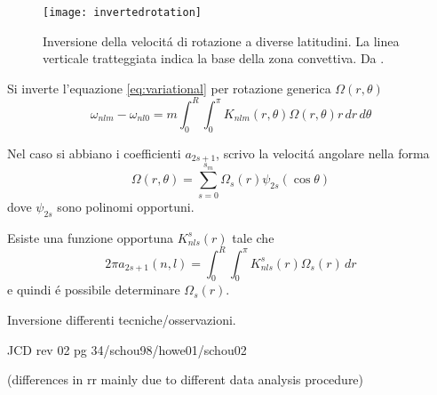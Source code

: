 \documentclass[../main.tex]{subfiles}
\begin{document}
\begin{figure}[!ht]
\centering
\texttt{[image: invertedrotation]}
\caption{Inversione della velocit\'a di rotazione a diverse latitudini. La linea verticale tratteggiata indica la base della zona convettiva. Da \cite{chr02helioseismology}.}
\end{figure}

Si inverte l'equazione \eqref{eq:variational} per rotazione generica $\Omega(r,\theta)$
\begin{equation}
\omega_{nlm}-\omega_{nl0}=m\int_0^R\int_0^{\pi}K_{nlm}(r,\theta)\Omega(r,\theta)r\,dr\,d\theta\label{eq:invrot2D}
\end{equation}

Nel caso si abbiano i coefficienti $a_{2s+1}$, scrivo la velocit\'a angolare nella forma
\begin{equation}
\Omega(r,\theta)=\sum_{s=0}^{s_m}\Omega_{s}(r)\psi_{2s}(\cos{\theta})\label{eq:angularv15}
\end{equation}
dove $\psi_{2s}$ sono polinomi opportuni.

Esiste una funzione opportuna $K_{nls}^{s}(r)$ tale che
\begin{equation}
2\pi a_{2s+1}(n,l)=\int_0^R\int_0^{\pi}K_{nls}^{s}(r)\Omega_s(r)\,dr
\end{equation}
e quindi \'e possibile determinare $\Omega_s(r)$.

\begin{workout}Inversione differenti tecniche/osservazioni.

JCD rev 02 pg 34/schou98/howe01/schou02

(differences in rr mainly due to different data analysis procedure)

\end{workout}
\end{document}
